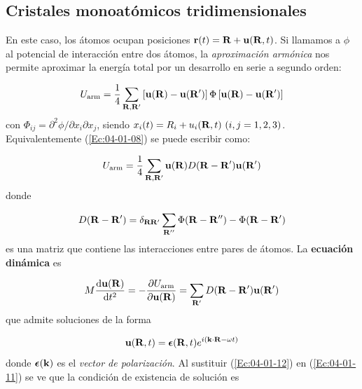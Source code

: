 \subsection{Cristales monoatómicos tridimensionales}

En este caso, los átomos ocupan posiciones $\mathbf{r}(t) = \mathbf{R} + \mathbf{u} (\mathbf{R},t)$. Si llamamos a $\phi$ al potencial de interacción entre dos átomos, la \textit{aproximación armónica} nos permite aproximar la energía total por un desarrollo en serie a segundo orden:

\begin{equation}
	U_{\text{arm}} = \frac{1}{4} \sum_{\mathbf{R},\mathbf{R}'} \left[ \mathbf{u}(\mathbf{R})-\mathbf{u}(\mathbf{R}') \right] \Phi \left[ \mathbf{u}(\mathbf{R})-\mathbf{u}(\mathbf{R}') \right] \label{Ec:04-01-08}
\end{equation}
con $\Phi_{ij}=\partial^2 \phi / \partial x_i \partial x_j$, siendo $x_i(t) = R_i + u_i (\Rn,t) \ (i,j=1,2,3)$. Equivalentemente (\ref{Ec:04-01-08}) se puede escribir como:

\begin{equation}
	U_{\text{arm}} = \frac{1}{4} \sum_{\mathbf{R},\mathbf{R}'}\mathbf{u}(\mathbf{R}) D(\mathbf{R}-\mathbf{R}' ) \mathbf{u}(\mathbf{R}') \label{Ec:04-01-09}
\end{equation}
donde 

\begin{equation}
	 D(\mathbf{R}-\mathbf{R}' ) = \delta_{\mathbf{R} \mathbf{R}'} \sum_{\mathbf{R}''} \Phi (\mathbf{R}- \mathbf{R}'') - \Phi (\mathbf{R} - \mathbf{R}')
\end{equation}
es una matriz que contiene las interacciones entre pares de átomos. La {\bf ecuación dinámica} es

\begin{equation}
 	M \frac{\mathrm{d} \mathbf{u} (\mathbf{R})}{\mathrm{d} t^2} =  - \frac{\partial U_\text{arm}}{\partial \mathbf{u} (\mathbf{R})} = \sum_{\mathbf{R}'} D (\mathbf{R}-\mathbf{R}') \mathbf{u} (\mathbf{R}') \label{Ec:04-01-11}
\end{equation}
que admite soluciones de la forma

\begin{equation}
	\mathbf{u} (\mathbf{R},t) = \boldsymbol{\epsilon} (\mathbf{R},t) e^{i(\mathbf{k} \cdot \mathbf{R} - \omega t)}  \label{Ec:04-01-12}
\end{equation}
donde $\boldsymbol{\epsilon}(\mathbf{k})$ es el \textit{vector de polarización}. Al sustituir  (\ref{Ec:04-01-12}) en (\ref{Ec:04-01-11}) se ve que la condición de existencia de solución es 

